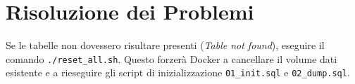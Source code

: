 \section{Risoluzione dei Problemi}
Se le tabelle non dovessero risultare presenti (\textit{Table not found}), eseguire il comando \texttt{./reset\_all.sh}. Questo forzerà Docker a cancellare il volume dati esistente e a rieseguire gli script di inizializzazione \texttt{01\_init.sql} e \texttt{02\_dump.sql}.

